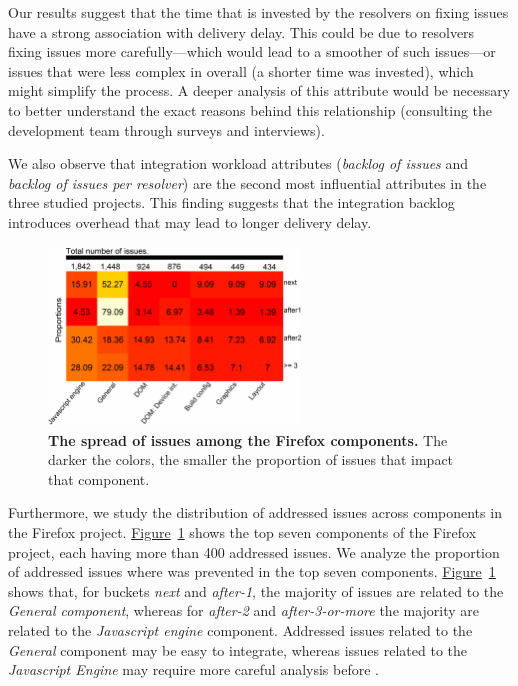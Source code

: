 Our results suggest that the time that is invested by the resolvers on fixing
issues have a strong association with delivery delay. This could be due to
resolvers fixing issues more carefully---which would lead to a smoother
\DIFdelbegin {}\DIFdelend \DIFaddbegin {}\DIFaddend of such issues---or issues that were less complex in overall (\eg a
shorter time was invested), which might simplify the \DIFdelbegin {}\DIFdelend \DIFaddbegin {}\DIFaddend process. A deeper
analysis of this attribute would be necessary to better understand the exact
reasons behind this relationship (\eg consulting the development team through
surveys and interviews). 

We also observe that integration workload attributes (\ie \textit{backlog of
issues} and \textit{backlog of issues per resolver}) are the second most
influential attributes in the three studied projects. This finding suggests that
the integration backlog introduces overhead that may lead to longer delivery
delay.

\begin{figure}[!t]
	\centering
	\includegraphics[width=0.60\textwidth,keepaspectratio]
	{chapters/chapter4/figures/firefox/RQ3_component_hm.pdf}
	\caption{\textbf{The spread of issues among the Firefox components.} The
		darker the colors, the smaller the proportion of issues that
	impact that component.}
	\label{ch4:fig:componentHeatmap}
\end{figure}

Furthermore, we study the distribution of addressed issues across components in the
Firefox project.
\hyperref[ch4:fig:componentHeatmap]{Figure}~\ref{ch4:fig:componentHeatmap} shows the top
seven components of the Firefox project, each having more than 400 addressed issues.
We analyze the proportion of addressed issues where \DIFdelbegin {}\DIFdelend \DIFaddbegin {}\DIFaddend was prevented in the
top seven components.
\hyperref[ch4:fig:componentHeatmap]{Figure}~\ref{ch4:fig:componentHeatmap} shows that,
for buckets \textit{next} and \textit{after-1}, the majority of issues are
related to the \textit{General component}, whereas for \textit{after-2} and
\textit{after-3-or-more} the majority are related to the \textit{Javascript
engine} component. Addressed issues related to the \textit{General} component
may be easy to integrate, whereas issues related to the \textit{Javascript
Engine} may require more careful analysis before \DIFdelbegin {}\DIFdelend \DIFaddbegin {}\DIFaddend .  \\


